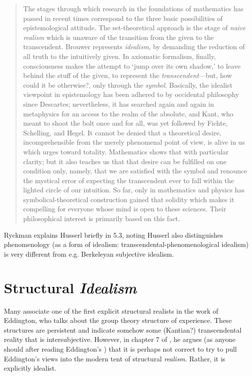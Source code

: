 \begin{quote}
    The stages through which research in the foundations of mathematics has passed in recent times correspond to the three basic possibilities of epistemological attitude.  The set-theoretical approach is the stage of \emph{naive realism} which is unaware of the transition from the given to the transcendent.  Brouwer represents \emph{idealism}, by demanding the reduction of all truth to the intuitively given.  In axiomatic formalism, finally, consciousness makes the attempt to `jump over its own shadow,' to leave behind the stuff of the given, to represent the \emph{transcendent}---but, how could it be otherwise?, only through the \emph{symbol}.  Basically, the idealist viewpoint in epistemology has been adhered to by occidental philosophy since Descartes; nevertheless, it has searched again and again in metaphysics for an access to the realm of the absolute, and Kant, who meant to shoot the bolt once and for all, was yet followed by Fichte, Schelling, and Hegel.  It cannot be denied that a theoretical desire, incomprehensible from the merely phenomenal point of view, is alive in us which urges toward totality. Mathematics shows that with particular clarity; but it also teaches us that that desire can be fulfilled on one condition only, namely, that we are satisfied with the symbol and renounce the mystical error of expecting the transcendent ever to fall within the lighted circle of our intuition.  So far, only in mathematics and physics has symbolical-theoretical construction gained that solidity which makes it compelling for everyone whose mind is open to these sciences.  Their philosophical interest is primarily based on this fact.

    \citep[p. 65-66]{Weyl1949}
\end{quote}




Ryckman explains Husserl briefly in 5.3, noting Husserl also distinguishes phenomenology (as a form of idealism: transcendental-phenomenological idealism) is very different from e.g. Berkeleyan subjective idealism.


\section{Structural \emph{Idealism}}

Many associate one of the first explicit structural realists in the work of Eddington, who talks about the group theory structure of experience.  These structures are persistent and indicate somehow some  (Kantian?) transcendental reality that is intersubjective.  However, in chapter 7 of \cite{Ryckman2005}, he argues (as anyone should after reading Eddington's \cite{Eddington1939}) that it is perhaps not correct to try to pull Eddington's views into the modern tent of structural \emph{realism}.  Rather, it is explicitly idealist.  

